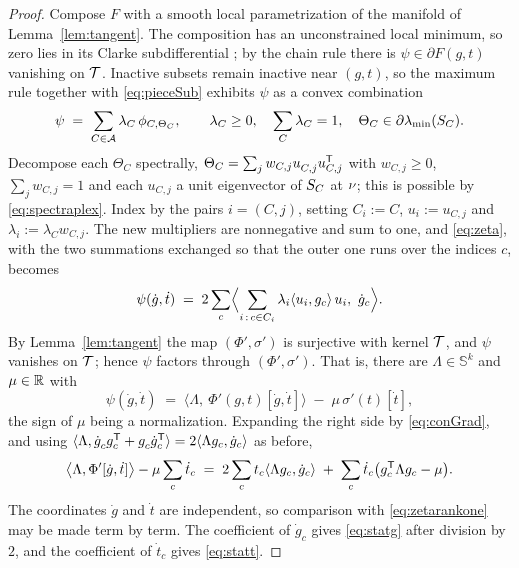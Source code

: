 \begin{proof}
Compose $F$ with a smooth local parametrization of the manifold of
Lemma~\ref{lem:tangent}.  The composition has an unconstrained local
minimum, so zero lies in its Clarke subdifferential
\cite[Prop.~2.3.2]{Clarke1990}; by the chain rule
\cite[Thm.~2.3.10]{Clarke1990} there is $\psi\in\partial F(g,t)$
vanishing on $\mathcal{T}$.  Inactive subsets remain inactive near $(g,t)$, so the
maximum rule \cite[Prop.~2.3.12]{Clarke1990} together with
\eqref{eq:pieceSub} exhibits $\psi$ as a convex combination
\begin{equation}\label{eq:zeta}
  \psi\;=\;\sum_{C\in\mathcal{A}}\lambda_C\,\phi_{C,\Theta_C},
  \qquad \lambda_C\ge0,\quad\sum_C\lambda_C=1,\quad
  \Theta_C\in\partial\lambda_{\min}(S_{C}).
\end{equation}
Decompose each $\Theta_C$ spectrally,
$\Theta_C=\sum_jw_{C,j}u_{C,j}^{\vphantom{\mathsf{T}}}u_{C,j}\tp$ with
$w_{C,j}\ge0$, $\sum_jw_{C,j}=1$ and each $u_{C,j}$ a unit eigenvector of
$S_{C}$ at $\nu$; this is possible by \eqref{eq:spectraplex}.  Index by the
pairs $i=(C,j)$, setting $C_i:=C$, $u_i:=u_{C,j}$ and
$\lambda_i:=\lambda_Cw_{C,j}$.  The new multipliers are nonnegative and
sum to one, and \eqref{eq:zeta}, with the two summations exchanged so that
the outer one runs over the indices $c$, becomes
\begin{equation}\label{eq:zetarankone}
  \psi(\dot g,\dot t)
  \;=\;2\sum_c\Bigl\langle
        \sum_{i\,:\,c\in C_i}\lambda_i\langle u_i,g_c\rangle\,u_i,\
        \dot g_c\Bigr\rangle .
\end{equation}
By Lemma~\ref{lem:tangent} the map $(\Phi',\sigma')$ is surjective with
kernel $\mathcal{T}$, and $\psi$ vanishes on $\mathcal{T}$; hence $\psi$ factors through
$(\Phi',\sigma')$.  That is, there are $\Lambda\in\mathbb{S}^k$ and
$\mu\in\mathbb{R}$ with
\begin{equation}\label{eq:lagrange}
  \psi(\dot g,\dot t)
  \;=\;\bigl\langle\Lambda,\ \Phi'(g,t)[\dot g,\dot t]\bigr\rangle
      \;-\;\mu\,\sigma'(t)[\dot t] ,
\end{equation}
the sign of $\mu$ being a normalization.  Expanding the right side by
\eqref{eq:conGrad}, and using
$\langle\Lambda,\dot g_c^{\vphantom{\mathsf{T}}}g_c\tp
+g_c^{\vphantom{\mathsf{T}}}\dot g_c\tp\rangle=2\langle\Lambda g_c,\dot g_c\rangle$
as before,
\[
  \bigl\langle\Lambda,\Phi'[\dot g,\dot t]\bigr\rangle
   -\mu\sum_c\dot t_c
  \;=\;
  2\sum_c t_c\langle\Lambda g_c,\dot g_c\rangle
  \;+\;\sum_c\dot t_c\bigl(g_c^{\mathsf{T}}\Lambda g_c-\mu\bigr).
\]
The coordinates $\dot g$ and $\dot t$ are independent, so comparison with
\eqref{eq:zetarankone} may be made term by term.  The coefficient of
$\dot g_c$ gives \eqref{eq:statg} after division by $2$, and the
coefficient of $\dot t_c$ gives \eqref{eq:statt}.
\end{proof}

